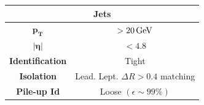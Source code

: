 \begin{table}[H]
    \centering

    \begin{tabular}{c|c}
        \toprule
        \multicolumn{2}{c}{\textbf{Jets}}\\
        \midrule
        \midrule
        
        $\mathbf{p_T}$& $>20 {\,\text{Ge\hspace{-.08em}V}}$\\
        \midrule
        $\bm{|\eta|}$& $<4.8$ \\
        \midrule
        \textbf{Identification} & Tight\\
        \midrule
        \textbf{Isolation} & Lead. Lept. $\Delta R>0.4$ matching\\
        \midrule
        \textbf{Pile-up Id} & Loose  $(\epsilon\sim99\%)$ \\
        \bottomrule
    \end{tabular}
\end{table}      

